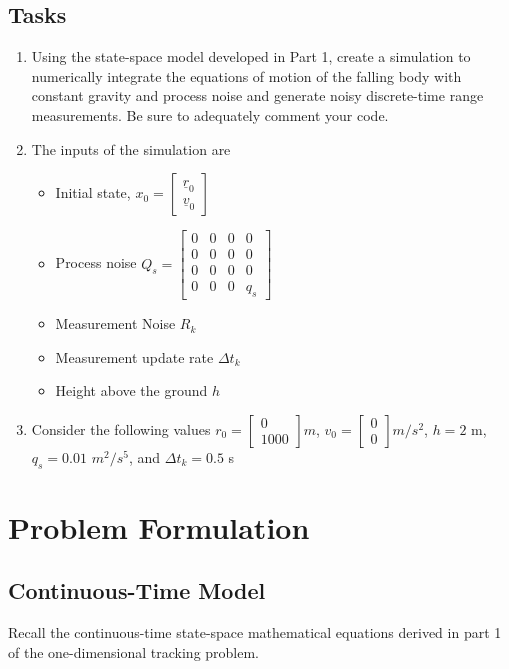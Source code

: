 \documentclass{article}
\begin{document}
\subsection{Tasks}

\begin{enumerate}
    \item Using the state-space model developed in Part 1, create a simulation to numerically integrate the equations of motion of the falling body with constant gravity and process noise and generate noisy discrete-time range measurements. Be sure to adequately comment your code.
    \item The inputs of the simulation are
    \begin{itemize}
        \item Initial state, $x_0 = \begin{bmatrix}
            \underline{r}_0 \\ \underline{v}_0
        \end{bmatrix}$
        \item Process noise $Q_s = \begin{bmatrix} 0 & 0 & 0 & 0 \\ 0 & 0 & 0 & 0 \\ 0 & 0 & 0 & 0 \\ 0 & 0 & 0 & q_s 
        \end{bmatrix}$
        \item Measurement Noise $R_k$
        \item Measurement update rate $\Delta t_k$
        \item Height above the ground $h$
    \end{itemize}
    \item Consider the following values $r_0 = \begin{bmatrix}
        0 \\ 1000
    \end{bmatrix} m$, $v_0 = \begin{bmatrix}
        0 \\ 0
    \end{bmatrix} m/s^2$, $h = 2$ m, $q_s = 0.01$ $m^2/s^5$, and $\Delta t_k = 0.5$ s 
\end{enumerate}

\section{Problem Formulation}

\subsection{Continuous-Time Model}
Recall the continuous-time state-space mathematical equations derived in part 1 of the one-dimensional tracking problem.
\end{document}
